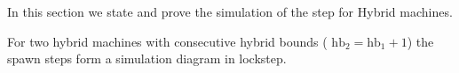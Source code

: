 In this section we state and prove the simulation of the  step for Hybrid machines.
\begin{lemma}%
\label{thm:simSpawn}
For two hybrid machines with consecutive hybrid bounds ( $\text{hb}_2 = \text{hb}_1 +1$) the spawn steps form a simulation diagram in lockstep.
%
\end{lemma}

